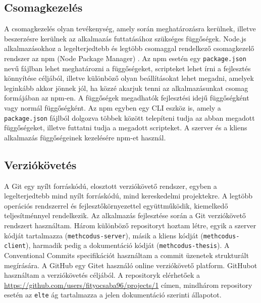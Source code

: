 \documentclass{elteikthesis}
\begin{document}
			\subsection{Csomagkezelés}
				A csomagkezelés olyan tevékenység, amely során meghatározásra kerülnek, illetve beszerzésre kerülnek az alkalmazás futtatásához szükséges függőségek. Node.js alkalmazásokhoz a legelterjedtebb és legtöbb csomaggal rendelkező csomagkezelő rendszer az npm (Node Package Manager) \cite{npm}. Az npm esetén egy \texttt{package.json} nevű fájlban lehet meghatározni a függőségeket, scripteket lehet írni a fejlesztés könnyítése céljából, illetve különböző olyan beállításokat lehet megadni, amelyek leginkább akkor jönnek jól, ha közzé akarjuk tenni az alkalmazásunkat csomag formájában az npm-en. A függőségek megadhatók fejlesztési idejű függőségként vagy normál függőségként. Az npm egyben egy CLI eszköz is, amely a \texttt{package.json} fájlból dolgozva többek között telepíteni tudja az abban megadott függőségeket, illetve futtatni tudja a megadott scripteket. A szerver és a kliens alkalmazás függőségeinek kezelésére npm-et használ.
			
			\subsection{Verziókövetés}
				A Git \cite{git} egy nyílt forráskódú, elosztott verziókövető rendszer, egyben a legelterjedtebb mind nyílt forráskódú, mind kereskedelmi projektekre. A legtöbb operációs rendszerrel és fejlesztőkörnyezettel együttműködik, kiemelkedő teljesítménnyel rendelkezik.	Az alkalmazás fejlesztése során a Git verziókövető rendszert használtam. Három különböző repositoryt hoztam létre, egyik a szerver kódját tartalmazza (\texttt{methcodus-server}), másik a kliens kódját (\texttt{methcodus-client}), harmadik pedig a dokumentáció kódját (\texttt{methcodus-thesis}). A Conventional Commits specifikációt használtam a commit üzenetek strukturált megírására. A GitHub egy Gitet használó online verziókövető platform. GitHubot használtam a verziókövetés céljából. A repositoryk elérhetőek a \url{https://github.com/users/fityocsaba96/projects/1} címen, mindhárom repository esetén az \texttt{elte} ág tartalmazza a jelen dokumentáció szerinti állapotot.
			
\end{document}
